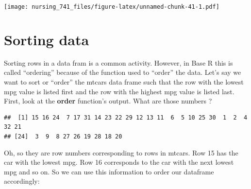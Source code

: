\documentclass[]{book}
\newenvironment{Shaded}{\begin{snugshade}}{\end{snugshade}}
\newcommand{\KeywordTok}[1]{\textcolor[rgb]{0.13,0.29,0.53}{\textbf{#1}}}
\newcommand{\NormalTok}[1]{#1}
\newcommand{\OperatorTok}[1]{\textcolor[rgb]{0.81,0.36,0.00}{\textbf{#1}}}
\begin{document}
\texttt{[image: nursing\_741\_files/figure-latex/unnamed-chunk-41-1.pdf]}

\hypertarget{sorting-data}{%
\section{Sorting data}\label{sorting-data}}

Sorting rows in a data fram is a common activity. However, in Base R this is called ``ordering'' because of the function used to ``order'' the data. Let's say we want to sort or ``order'' the mtcars data frame such that the row with the lowest mpg value is listed first and the row with the highest mpg value is listed last. First, look at the \textbf{order} function's output. What are those numbers ?

\begin{Shaded}
\end{Shaded}

\begin{verbatim}
##  [1] 15 16 24  7 17 31 14 23 22 29 12 13 11  6  5 10 25 30  1  2  4 32 21
## [24]  3  9  8 27 26 19 28 18 20
\end{verbatim}

Oh, so they are row numbers corresponding to rows in mtcars. Row 15 has the car with the lowest mpg. Row 16 corresponds to the car with the next lowest mpg and so on. So we can use this information to order our dataframe accordingly:

\begin{Shaded}
\end{Shaded}
\end{document}
